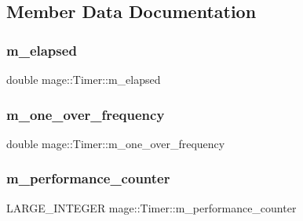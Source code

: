 \subsection{Member Data Documentation}
\hypertarget{classmage_1_1_timer_aa2c50b9ffa85600791a21e2db4c43e91}{}\label{classmage_1_1_timer_aa2c50b9ffa85600791a21e2db4c43e91} 
\subsubsection{\texorpdfstring{m\+\_\+elapsed}{m\_elapsed}}
{\footnotesize\ttfamily double mage\+::\+Timer\+::m\+\_\+elapsed\hspace{0.3cm}{\ttfamily [private]}}

\hypertarget{classmage_1_1_timer_a8e73b09880114bc7ab47c8698a40c976}{}\label{classmage_1_1_timer_a8e73b09880114bc7ab47c8698a40c976} 
\subsubsection{\texorpdfstring{m\+\_\+one\+\_\+over\+\_\+frequency}{m\_one\_over\_frequency}}
{\footnotesize\ttfamily double mage\+::\+Timer\+::m\+\_\+one\+\_\+over\+\_\+frequency\hspace{0.3cm}{\ttfamily [private]}}

\hypertarget{classmage_1_1_timer_a70bdbf53f8cd69a46db8b75e08d3ead8}{}\label{classmage_1_1_timer_a70bdbf53f8cd69a46db8b75e08d3ead8} 
\subsubsection{\texorpdfstring{m\+\_\+performance\+\_\+counter}{m\_performance\_counter}}
{\footnotesize\ttfamily L\+A\+R\+G\+E\+\_\+\+I\+N\+T\+E\+G\+ER mage\+::\+Timer\+::m\+\_\+performance\+\_\+counter\hspace{0.3cm}{\ttfamily [private]}}

\hypertarget{classmage_1_1_timer_a1618c4901b6f898165a2d79d02a2518e}{}\label{classmage_1_1_timer_a1618c4901b6f898165a2d79d02a2518e} 
